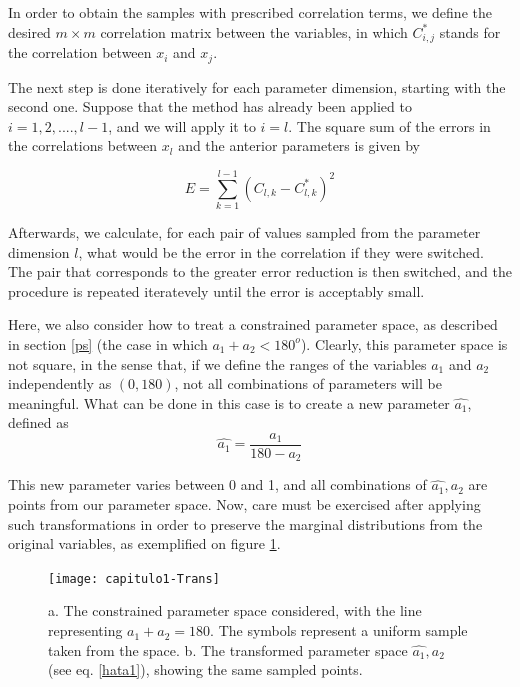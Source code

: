 In order to obtain the samples with prescribed correlation terms, we define the 
desired $m \times m$ correlation matrix between the variables, in which 
$C_{i,j}^*$ stands for the correlation between $x_i$ and $x_j$.

The next step is done iteratively for each parameter dimension, starting with the second one. Suppose that the method has already been applied to $i=1,2,....,l-1$, 
and we will apply it to $i=l$. The square sum of the errors in the correlations 
between $x_l$ and the anterior parameters is given by

\begin{equation}
	E = \sum_{k=1}^{l-1} \left( C_{l, k} - C_{l,k}^* \right) ^2
	\label{Error}
\end{equation}

Afterwards, we calculate, for each pair of values sampled from the parameter 
dimension $l$, what would be the error in the correlation if they were switched.
The pair that corresponds to the greater error reduction is then switched, and
the procedure is repeated iteratevely until the error is acceptably small.

Here, we also consider how to treat a constrained parameter space, as described
in section \ref{ps} (the case in which $a_1+a_2 <180^o$). Clearly, this
parameter space is not square, in the sense that, if we define the ranges of
the variables $a_1$ and $a_2$ independently as $(0,180)$, not all combinations
of parameters will be meaningful. What can be done in this case is to create
a new parameter $\hat{a_1}$, defined as
\begin{equation}
	\hat{a_1} = \frac{a_1}{180-a_2}
	\label{hata1}
\end{equation}

This new parameter varies between 0 and 1, and all combinations of 
$\hat{a_1}, a_2$ are points from our parameter space. Now, care must be 
exercised after applying such transformations in order to preserve the marginal
distributions from the original variables, as exemplified on figure 
\ref{fig:Trans}.

\begin{figure}[htbp]
	\begin{center}
\texttt{[image: capitulo1-Trans]}
	\end{center}
	\caption{a. The constrained parameter space considered, 
	with the line representing $a_1+a_2=180$. The symbols represent 
	a uniform sample taken from the space. b. The transformed parameter 
	space $\hat{a_1}, a_2$ (see eq. \ref{hata1}), showing the same sampled
	points.}
	\label{fig:Trans}
\end{figure}

